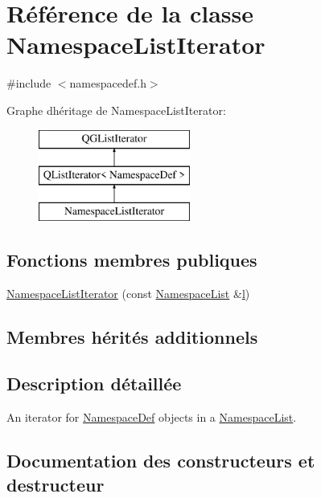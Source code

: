 \hypertarget{class_namespace_list_iterator}{}\section{Référence de la classe Namespace\+List\+Iterator}
\label{class_namespace_list_iterator}


{\ttfamily \#include $<$namespacedef.\+h$>$}

Graphe d\textquotesingle{}héritage de Namespace\+List\+Iterator\+:\begin{figure}[H]
\begin{center}
\leavevmode
\includegraphics[height=3.000000cm]{class_namespace_list_iterator}
\end{center}
\end{figure}
\subsection*{Fonctions membres publiques}
\begin{DoxyCompactItemize}
\item 
\hyperlink{class_namespace_list_iterator_a4e8539142f60572b02b40228ba2d8111}{Namespace\+List\+Iterator} (const \hyperlink{class_namespace_list}{Namespace\+List} \&\hyperlink{060__command__switch_8tcl_aff56f84b49947b84b2a304f51cf8e678}{l})
\end{DoxyCompactItemize}
\subsection*{Membres hérités additionnels}


\subsection{Description détaillée}
An iterator for \hyperlink{class_namespace_def}{Namespace\+Def} objects in a \hyperlink{class_namespace_list}{Namespace\+List}. 

\subsection{Documentation des constructeurs et destructeur}
\hypertarget{class_namespace_list_iterator_a4e8539142f60572b02b40228ba2d8111}{}
